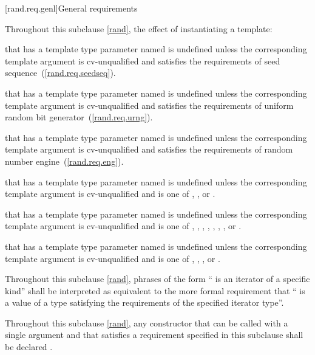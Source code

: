 [rand.req.genl]{General requirements}%

\pnum
Throughout this subclause \ref{rand},
the effect of instantiating a template:
\begin{enumeratea}
  \item
    that has a template type parameter
    named 
    is undefined unless the corresponding template argument
    is cv-unqualified and
    satisfies the requirements
    of seed sequence~(\ref{rand.req.seedseq}).
  \item
    that has a template type parameter
    named 
    is undefined unless the corresponding template argument
    is cv-unqualified and
    satisfies the requirements
    of uniform random bit generator~(\ref{rand.req.urng}).
  \item
    that has a template type parameter
    named 
    is undefined unless the corresponding template argument
    is cv-unqualified and
    satisfies the requirements
    of random number engine~(\ref{rand.req.eng}).
  \item
    that has a template type parameter
    named 
    is undefined unless the corresponding template argument
    is cv-unqualified and
    is one of
    , , or .
  \item
    that has a template type parameter
    named 
    is undefined unless the corresponding template argument
    is cv-unqualified and
    is one of
      ,
      ,
      ,
      ,
      ,
      ,
      ,
      or
      .
  \item
    that has a template type parameter
    named 
    is undefined unless the corresponding template argument
    is cv-unqualified and
    is one of
      ,
      ,
      ,
      or
      .
\end{enumeratea}

\pnum
Throughout this subclause \ref{rand},
phrases of the form `` is an iterator of a specific kind''
shall be interpreted as equivalent to the more formal requirement that
`` is a value
of a type satisfying the requirements
of the specified iterator type''.

\pnum
Throughout this subclause \ref{rand},
any constructor that can be called with a single argument
and that satisfies a requirement specified in this subclause
shall be declared .

